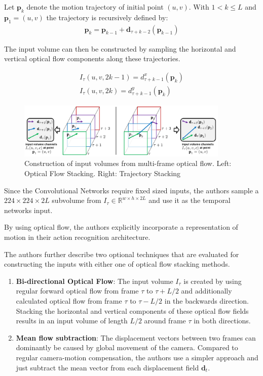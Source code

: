 Let $\mathbf{p}_k$ denote the motion trajectory of initial point $(u,v)$. With $1 < k \leq L$ and \mbox{$\mathbf{p}_1 = (u,v)$} the trajectory is recursively defined by:
\begin{align*}
    \mathbf{p}_k = \mathbf{p}_{k-1} + \mathbf{d}_{\tau + k - 2}(\mathbf{p}_{k-1})
\end{align*}

The input volume can then be constructed by sampling the horizontal and vertical optical flow components along these trajectories.

\begin{align*}
    I_\tau(u,v,2k-1) = d_{\tau + k - 1}^x(\mathbf{p}_{k}) \\
    I_\tau(u,v,2k) = d_{\tau + k - 1}^y(\mathbf{p}_{k})
\end{align*}

\begin{figure}[H]
    \centering
    \includegraphics[width=0.9\textwidth]{img_deep/trajectory_stacking}
    \caption{Construction of input volumes from multi-frame optical flow. Left: Optical Flow Stacking. Right: Trajectory Stacking \cite{simonyan_two-stream_2014}}
    \label{fig:trajectory_stacking}
\end{figure}

Since the Convolutional Networks require fixed sized inputs, the authors sample a $224 \times 224 \times 2L$ subvolume from $I_\tau \in \mathbb{R}^{w \times h \times 2L}$ and use it as the temporal networks input.

By using optical flow, the authors explicitly incorporate a representation of motion in their action recognition architecture.

The authors further describe two optional techniques that are evaluated for constructing the inputs with either one of optical flow stacking methods.
\begin{enumerate}
    \item \textbf{Bi-directional Optical Flow}: The input volume $I_{\tau}$ is created by using regular forward optical flow from frame $\tau$ to $\tau + L/2$ and additionally calculated optical flow from frame $\tau$ to $\tau - L/2$ in the backwards direction. Stacking the horizontal and vertical components of these optical flow fields results in an input volume of length $L/2$ around frame $\tau$ in both directions. 
    \item \textbf{Mean flow subtraction}: The displacement vectors between two frames can dominantly be caused by global movement of the camera. Compared to regular camera-motion compensation, the authors use a simpler approach and just subtract the mean vector from each displacement field $\mathbf{d}_t$.
\end{enumerate}

